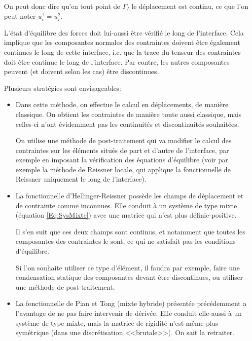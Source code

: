 On peut donc dire qu'en tout point de $\Gamma_I$ le déplacement est 
continu, ce que l'on peut noter $u_i^1=u_i^2$.

\medskip
L'état d'équilibre des forces doit lui-aussi être vérifié le long de l'interface.
Cela implique que les composantes normales des contraintes doivent être également
continues le long de cette interface, i.e. que la trace du tenseur des contraintes doit
être continue le long de l'interface.
Par contre, les autres composantes peuvent (et doivent selon les cas) être
discontinues.

\bigskip
Plusieurs stratégies sont envisageables:
\begin{itemize}
   \item {}

	Dans cette méthode, on effectue le calcul en déplacements, de manière classique.
	On obtient les contraintes de manière toute aussi classique, mais celles-ci
	n'ont évidemment pas les continuités et discontinuités souhaitées.

	On utilise une méthode de post-traitement qui va modifier le calcul des contraintes
	sur les éléments situés de part et d'autre de l'interface, par exemple 
	en imposant la vérification des équations d'équilibre (voir par exemple
	la méthode de Reissner locale, qui applique la fonctionnelle de Reissner uniquement
	le long de l'interface).
   \item {}

	La fonctionnelle d'Hellinger-Reissner possède les champs de déplacement et de
	contrainte comme inconnues. Elle conduit à un système de type mixte
	(équation \ref{Eq:SysMixte}) avec une matrice qui n'est plus définie-positive.

	Il s'en suit que ces deux champs sont continus, et notamment que toutes les
	composantes des contraintes le sont, ce qui ne satisfait pas les conditions
	d'équilibre.

	Si l'on souhaite utiliser ce type d'élément, il faudra par exemple, faire une
	condensation statique des composantes devant être discontinues, ou
	utiliser une méthode de post-traitement.
   \item {}

	La fonctionnelle de Pian et Tong (mixte hybride) 
	présentée précédemment
	a l'avantage de ne pas faire intervenir de dérivée. Elle conduit elle-aussi
	à un système de type mixte, mais la matrice de rigidité n'est même
	plus symétrique (dans une discrétisation <<brutale>>). On sait la retraiter.


\end{itemize}
